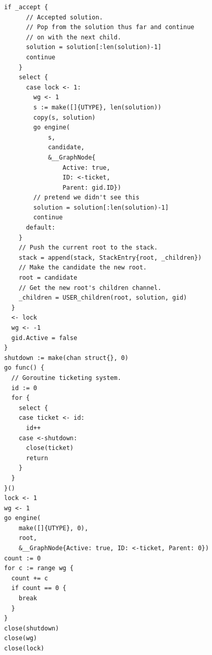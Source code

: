 \documentclass[runningheads]{llncs}
\begin{document}
\begin{appendix}
\begin{lstlisting}[language=Golang, style=boxed]
    if _accept {
      // Accepted solution.
      // Pop from the solution thus far and continue
      // on with the next child.
      solution = solution[:len(solution)-1]
      continue
    }
    select {
      case lock <- 1:
        wg <- 1
        s := make([]{UTYPE}, len(solution))
        copy(s, solution)
        go engine(
        	s,
        	candidate,
        	&__GraphNode{
        		Active: true,
        		ID: <-ticket,
        		Parent: gid.ID})
        // pretend we didn't see this
        solution = solution[:len(solution)-1]
        continue
      default:
    }
    // Push the current root to the stack.
    stack = append(stack, StackEntry{root, _children})
    // Make the candidate the new root.
    root = candidate
    // Get the new root's children channel.
    _children = USER_children(root, solution, gid)
  }
  <- lock
  wg <- -1
  gid.Active = false
}
shutdown := make(chan struct{}, 0)
go func() {
  // Goroutine ticketing system.
  id := 0
  for {
    select {
    case ticket <- id:
      id++
    case <-shutdown:
      close(ticket)
      return
    }
  }
}()
lock <- 1
wg <- 1
go engine(
	make([]{UTYPE}, 0),
	root,
	&__GraphNode{Active: true, ID: <-ticket, Parent: 0})
count := 0
for c := range wg {
  count += c
  if count == 0 {
    break
  }
}
close(shutdown)
close(wg)
close(lock)
\end{lstlisting}
\end{appendix}
\end{document}
